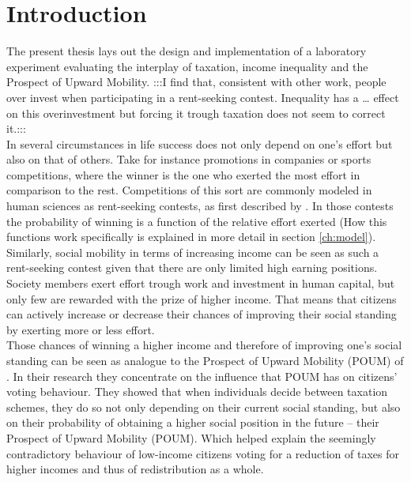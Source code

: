 \chapter{Introduction}
\thispagestyle{fancy}
\label{ch:intro}


The present thesis lays out the design and implementation of a laboratory experiment evaluating the interplay of taxation, income inequality and the Prospect of Upward Mobility. :::I find that, consistent with other work, people over invest when participating in a rent-seeking contest. Inequality has a … effect on this overinvestment but forcing it trough taxation does not seem to correct it.::: \\

In several circumstances in life success does not only depend on one's effort but also on that of others. Take for instance promotions in companies or sports competitions, where the winner is the one who exerted the most effort in comparison to the rest. Competitions of this sort are commonly modeled in human sciences as rent-seeking contests, as first described by \cite{tullock1980}. In those contests the probability of winning is a function of the relative effort exerted (How this functions work specifically is explained in more detail in section \ref{ch:model}).\\

Similarly, social mobility in terms of increasing income can be seen as such a rent-seeking contest given that there are only limited high earning positions. Society members exert effort trough work and investment in human capital, but only few are rewarded with the prize of higher income. That means that citizens can actively increase or decrease their chances of improving their social standing by exerting more or less effort.\\

Those chances of winning a higher income and therefore of improving one's social standing can be seen as analogue to the Prospect of Upward Mobility (POUM) of \cite{benabou2001}. In their research they concentrate on the influence that POUM has on citizens' voting behaviour. They showed that when individuals decide between taxation schemes, they do so not only depending on their current social standing, but also on their probability of obtaining a higher social position in the future -- their Prospect of Upward Mobility (POUM). Which helped explain the seemingly contradictory behaviour of low-income citizens voting for a reduction of taxes for higher incomes and thus of redistribution as a whole.\\

